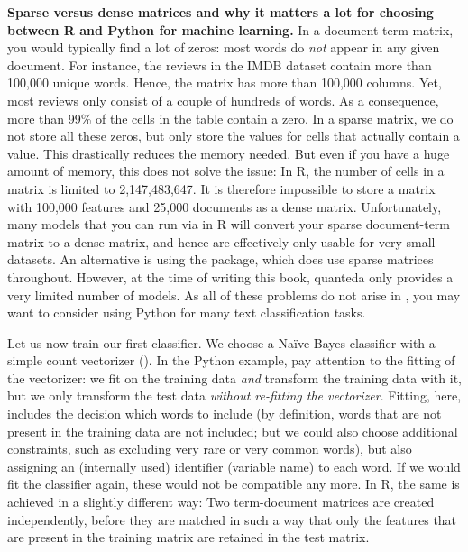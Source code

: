 \label{feature:sparse}
\begin{feature}
  \textbf{Sparse versus dense matrices and why it matters a lot for
    choosing between R and Python for machine learning.} In a
  document-term matrix, you would typically find a lot of zeros: most
  words do \emph{not} appear in any given document. For instance, the
  reviews in the IMDB dataset contain more than 100,000 unique
  words. Hence, the matrix has more than 100,000 columns. Yet, most
  reviews only consist of a couple of hundreds of words. As a
  consequence, more than 99\% of the cells in the table contain a
  zero. In a sparse matrix, we do not store all these zeros, but only
  store the values for cells that actually contain a value. This
  drastically reduces the memory needed.  But even if you have a huge
  amount of memory, this does not solve the issue: In R, the number of
  cells in a matrix is limited to 2,147,483,647. It is therefore
  impossible to store a matrix with 100,000 features and 25,000
  documents as a dense matrix. Unfortunately, many models that you can
  run via  in R will convert your sparse document-term
  matrix to a dense matrix, and hence are effectively only usable for
  very small datasets. An alternative is using the  package,
  which does use sparse matrices throughout. However, at the time of
  writing this book, quanteda only provides a very limited number of
  models. As all of these problems do not arise in ,
  you may want to consider using Python for many text classification tasks.
\end{feature}


Let us now train our first classifier. We choose a Na\"ive Bayes
classifier with a simple count vectorizer ().  In
the Python example, pay attention to the fitting of the vectorizer: we
fit on the training data \emph{and} transform the training data with
it, but we only transform the test data \emph{without re-fitting the
  vectorizer}. Fitting, here, includes the decision which words to
include (by definition, words that are not present in the training
data are not included; but we could also choose additional
constraints, such as excluding very rare or very common words), but
also assigning an (internally used) identifier (variable name) to each
word. If we would fit the classifier again, these would not be
compatible any more. In R, the same is achieved in a slightly
different way: Two term-document matrices are created independently,
before they are matched in such a way that only the features that are
present in the training matrix are retained in the test matrix.


